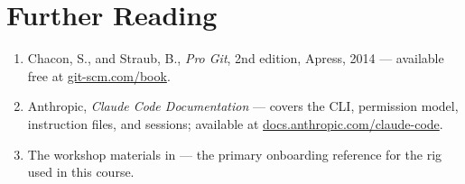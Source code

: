 \section*{Further Reading}

\begin{small}
\begin{enumerate}
\item Chacon, S., and Straub, B., \emph{Pro Git}, 2nd edition, Apress, 2014 — available free at \href{https://git-scm.com/book}{git-scm.com/book}.
\item Anthropic, \emph{Claude Code Documentation} — covers the CLI, permission model, instruction files, and sessions; available at \href{https://docs.anthropic.com/claude-code}{docs.anthropic.com/claude-code}.
\item The workshop materials in  — the primary onboarding reference for the rig used in this course.
\end{enumerate}
\end{small}
